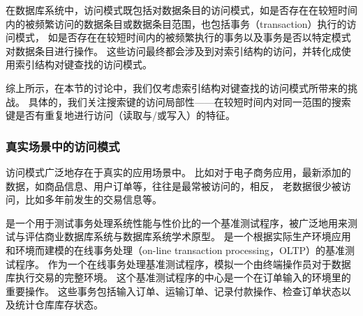 
在数据库系统中，访问模式既包括对数据条目的访问模式，如是否存在在较短时间内的被频繁访问的数据条目或数据条目范围，也包括事务（transaction）执行的访问模式，
如是否存在在较短时间内的被频繁执行的事务以及事务是否以特定模式对数据条目进行操作。
这些访问最终都会涉及到对索引结构的访问，并转化成使用索引结构对键查找的访问模式。

综上所示，在本节的讨论中，我们仅考虑索引结构对键查找的访问模式所带来的挑战。
具体的，我们关注搜索键的访问局部性{------}在较短时间内对同一范围的搜索键是否有重复地进行访问（读取与/或写入）的特征。



\subsubsection{真实场景中的访问模式}

访问模式广泛地存在于真实的应用场景中。
比如对于电子商务应用，最新添加的数据，如商品信息、用户订单等，往往是最常被访问的，相反，
老数据很少被访问，比如多年前发生的交易信息等。

{\tpcc}是一个用于测试事务处理系统性能与性价比的一个基准测试程序，被广泛地用来测试与评估商业数据库系统与数据库系统学术原型。
{\tpcc}是一个根据实际生产环境应用和环境而建模的在线事务处理（on-line transaction processing，OLTP）的基准测试程序。
作为一个在线事务处理基准测试程序，{\tpcc}模拟一个由终端操作员对于数据库执行交易的完整环境。
这个基准测试程序的中心是一个在订单输入的环境里的重要操作。
这些事务包括输入订单、运输订单、记录付款操作、检查订单状态以及统计仓库库存状态。

